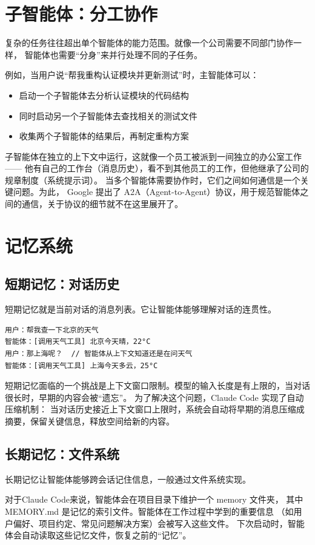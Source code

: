 \section{子智能体：分工协作}
复杂的任务往往超出单个智能体的能力范围。就像一个公司需要不同部门协作一样，
智能体也需要“分身”来并行处理不同的子任务。

例如，当用户说“帮我重构认证模块并更新测试”时，主智能体可以：
\begin{itemize}
	\item 启动一个子智能体去分析认证模块的代码结构
	\item 同时启动另一个子智能体去查找相关的测试文件
	\item 收集两个子智能体的结果后，再制定重构方案
\end{itemize}

子智能体在独立的上下文中运行，这就像一个员工被派到一间独立的办公室工作——
他有自己的工作台（消息历史），看不到其他员工的工作，但他继承了公司的规章制度（系统提示词）。
当多个智能体需要协作时，它们之间如何通信是一个关键问题。为此，
Google 提出了 A2A（Agent-to-Agent）协议，用于规范智能体之间的通信，关于协议的细节就不在这里展开了。

\section{记忆系统}
\subsection{短期记忆：对话历史}
短期记忆就是当前对话的消息列表。它让智能体能够理解对话的连贯性。

\begin{verbatim}
用户：帮我查一下北京的天气
智能体：[调用天气工具] 北京今天晴，22°C
用户：那上海呢？  // 智能体从上下文知道还是在问天气
智能体：[调用天气工具] 上海今天多云，25°C
\end{verbatim}

短期记忆面临的一个挑战是上下文窗口限制。模型的输入长度是有上限的，当对话很长时，早期的内容会被“遗忘”。
为了解决这个问题，Claude Code 实现了自动压缩机制：
当对话历史接近上下文窗口上限时，系统会自动将早期的消息压缩成摘要，保留关键信息，释放空间给新的内容。

\subsection{长期记忆：文件系统}
长期记忆让智能体能够跨会话记住信息，一般通过文件系统实现。

对于Claude Code来说，智能体会在项目目录下维护一个 memory 文件夹，
其中 MEMORY.md 是记忆的索引文件。智能体在工作过程中学到的重要信息
（如用户偏好、项目约定、常见问题解决方案）会被写入这些文件。
下次启动时，智能体会自动读取这些记忆文件，恢复之前的“记忆”。

